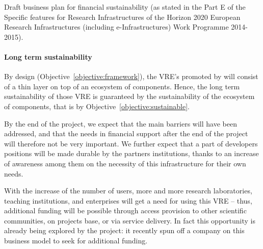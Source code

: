 
Draft business plan for financial sustainability (as stated in the Part
E of the Specific features for Research Infrastructures of the Horizon
2020 European Research Infrastructures (including e-Infrastructures)
Work Programme 2014-2015).

\paragraph{Long term sustainability}

By design (Objective~\ref{objective:framework}), the VRE's promoted by
\TheProject will consist of a thin layer on top of an ecosystem of
components. Hence, the long term sustainability of those VRE is
guaranteed by the sustainability of the ecosystem of components, that
is by Objective~\ref{objective:sustainable}.

By the end of the project, we expect that the main barriers will have
been addressed, and that the needs in financial support after the end
of the project will therefore not be very important. We further expect
that a part of developers positions will be made durable by the
partners institutions, thanks to an increase of awareness among them
on the necessity of this infrastructure for their own needs.

With the increase of the number of users, more and more research
laboratories, teaching institutions, and enterprises will get a need
for using this VRE -- thus, additional funding will be possible
through access provision to other scientific communities, on projects
base, or via service delivery. In fact this opportunity is already
being explored by the \SMC project: it recently spun off a company on
this business model to seek for additional funding.






